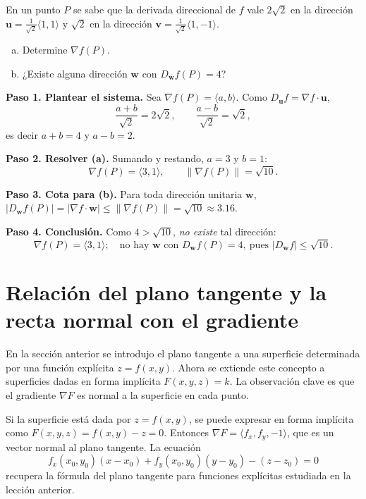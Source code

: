 \begin{prob}
En un punto $P$ se sabe que la derivada direccional de $f$ vale $2\sqrt2$ en
la dirección $\mathbf{u}=\tfrac1{\sqrt2}\langle 1,1\rangle$ y $\sqrt2$ en la
dirección $\mathbf{v}=\tfrac1{\sqrt2}\langle 1,-1\rangle$.
\begin{enumerate}[a)]
  \item Determine $\nabla f(P)$.
  \item ¿Existe alguna dirección $\mathbf{w}$ con $D_{\mathbf{w}}f(P)=4$?
\end{enumerate}
\begin{myproof}
\textbf{Paso 1. Plantear el sistema.}
Sea $\nabla f(P)=\langle a,b\rangle$. Como $D_{\mathbf u}f=\nabla f\cdot\mathbf u$,
\[
  \frac{a+b}{\sqrt2}=2\sqrt2,\qquad \frac{a-b}{\sqrt2}=\sqrt2,
\]
es decir $a+b=4$ y $a-b=2$.

\textbf{Paso 2. Resolver (a).}
Sumando y restando, $a=3$ y $b=1$:
\[
  \nabla f(P)=\langle 3,1\rangle,\qquad \|\nabla f(P)\|=\sqrt{10}.
\]

\textbf{Paso 3. Cota para (b).}
Para toda dirección unitaria $\mathbf w$,
$|D_{\mathbf w}f(P)|=|\nabla f\cdot\mathbf w|\le\|\nabla f(P)\|=\sqrt{10}\approx 3.16$.

\textbf{Paso 4. Conclusión.}
Como $4>\sqrt{10}$, \emph{no existe} tal dirección:
\[
  \boxed{\ \nabla f(P)=\langle 3,1\rangle;\quad
  \text{no hay }\mathbf w\text{ con }D_{\mathbf w}f(P)=4,\ \text{pues }
  |D_{\mathbf w}f|\le\sqrt{10}.\ }
\]
\end{myproof}
\end{prob}

\section{Relación del plano tangente y la recta normal con el gradiente}

En la sección anterior se introdujo el plano tangente a una superficie
determinada por una función explícita $z=f(x,y)$. Ahora se extiende este
concepto a superficies dadas en forma implícita $F(x,y,z)=k$. La
observación clave es que el gradiente $\nabla F$ es normal a la
superficie en cada punto.

\begin{rem}
Si la superficie está dada por $z=f(x,y)$, se puede expresar en forma
implícita como $F(x,y,z) = f(x,y) - z = 0$. Entonces
$\nabla F = \langle f_x, f_y, -1 \rangle$, que es un vector normal al
plano tangente. La ecuación
\[
f_x(x_0,y_0)(x-x_0) + f_y(x_0,y_0)(y-y_0) - (z-z_0) = 0
\]
recupera la fórmula del plano tangente para funciones explícitas
estudiada en la lección anterior.
\end{rem}

